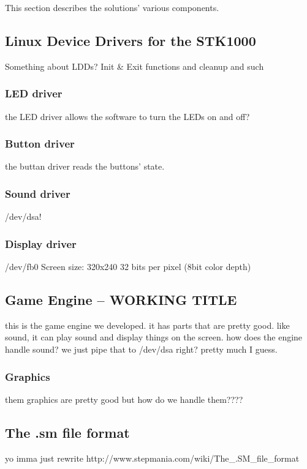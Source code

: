 This section describes the solutions' various components.

\subsection{Linux Device Drivers for the STK1000}
	Something about LDDs?
	Init & Exit functions and cleanup and such

	\subsubsection{LED driver}
		the LED driver allows the software to turn the LEDs on and off?
	\subsubsection{Button driver}
		the buttan driver reads the buttons' state.	

	\subsubsection{Sound driver}
		/dev/dsa!
	\subsubsection{Display driver}
		/dev/fb0
		Screen size: 320x240
		32 bits per pixel (8bit color depth)

\subsection{Game Engine -- WORKING TITLE}
	this is the game engine we developed. it has parts that are pretty good. like sound, it can play sound and display things on the screen.
		how does the engine handle sound?
		we just pipe that to /dev/dsa right?
		pretty much I guess.
	\subsubsection{Graphics}
		them graphics are pretty good but how do we handle them????

\subsection{The .sm file format}
	yo imma just rewrite http://www.stepmania.com/wiki/The_.SM_file_format